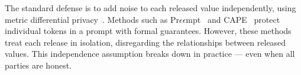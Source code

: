 The standard defense is to add noise to each released value independently, using metric differential privacy~\cite{Chatzikokolakis2013BroadeningTS}. Methods such as Pr$\epsilon\epsilon$mpt~\cite{chowdhury2025} and CAPE~\cite{wu2025capecontextawarepromptperturbation} protect individual tokens in a prompt with formal guarantees. However, these methods treat each release in isolation, disregarding the relationships between released values. This independence assumption breaks down in practice --- even when all parties are honest.

 
 

